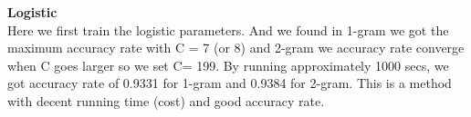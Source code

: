\textbf{Logistic}\\
Here we first train the logistic parameters. And we found in 1-gram we got the maximum accuracy rate with C = 7 (or 8) and 2-gram we accuracy rate converge when C goes larger so we set C= 199. By running approximately 1000 secs, we got accuracy rate of 0.9331 for 1-gram and 0.9384 for 2-gram. This is a method with decent running time (cost) and  good accuracy rate. 